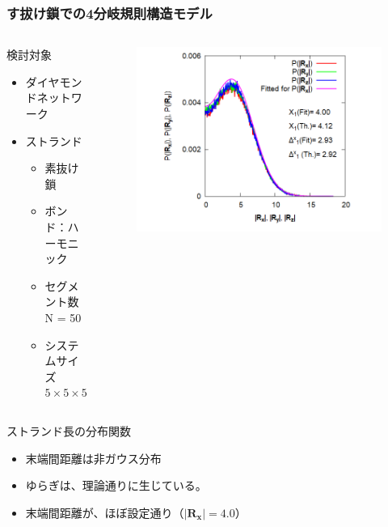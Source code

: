 \documentclass[11pt, dvipdfmx]{beamer}
\begin{document}
\begin{frame}
\frametitle{す拔け鎖での4分岐規則構造モデル}
\vspace{-3mm}

\begin{columns}[totalwidth=\linewidth]
\begin{block}{検討対象}
\begin{itemize}
\item
ダイヤモンドネットワーク
\item
ストランド
	\begin{itemize}
	\item 
	素抜け鎖
 	\item 
 	ボンド：ハーモニック
 	\item
 	セグメント数 N = 50
 	\item
	システムサイズ\\
	$5\times 5\times 5$
	\end{itemize}
\end{itemize}
\end{block}

\begin{figure}
\includegraphics[width=\columnwidth]{./fig/Strand_histgram_reg_4.png}
\end{figure}
\end{columns}

\begin{columns}[totalwidth=\linewidth]
\vspace{-2mm}
\begin{exampleblock}{ストランド長の分布関数}
\begin{itemize}
\item
末端間距離は非ガウス分布
\item
ゆらぎは、理論通りに生じている。
\item
末端間距離が、ほぼ設定通り（$|\bm{R_x}| = 4.0$）
\end{itemize}
\end{exampleblock}


\end{columns}
\end{frame}
\end{document}
